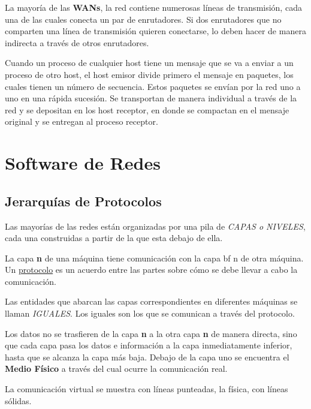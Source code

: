 \documentclass[12pt]{report}
\begin{document}
 La mayor\'ia de las {\bf WANs}, la red contiene numerosas l\'ineas de transmisi\'on, cada una de las cuales conecta un par de enrutadores. Si dos enrutadores que no comparten una l\'inea de transmisi\'on quieren conectarse, lo deben hacer de manera indirecta a trav\'es de otros enrutadores.
  
Cuando un proceso de cualquier host tiene un mensaje que se va a enviar a un proceso de otro host, el host emisor divide primero el mensaje en paquetes, los cuales tienen un n\'umero de secuencia. Estos paquetes se env\'ian por la red uno a uno en una r\'apida sucesi\'on. Se transportan de manera individual a trav\'es de la red y se depositan en los host receptor, en donde se compactan en el mensaje original y se entregan al proceso receptor. 

\section*{Software de Redes}
\subsection*{Jerarqu\'ias de Protocolos}

Las mayor\'ias de las redes est\'an organizadas por una pila de \textit {CAPAS o NIVELES}, cada una construidas a partir de la que esta debajo de ella. 

La capa {\bf n} de una m\'aquina tiene comunicaci\'on con la capa {bf n} de otra m\'aquina. Un \underline {protocolo} es un acuerdo entre las partes sobre c\'omo se debe llevar a cabo la comunicaci\'on.
 
Las entidades que abarcan las capas correspondientes en diferentes m\'aquinas se llaman \textit {IGUALES}. Los iguales son los que se comunican a trav\'es del protocolo.


Los datos no se trasfieren de la capa {\bf n}  a la otra capa {\bf n} de manera directa, sino que cada capa pasa los datos e informaci\'on a la capa inmediatamente inferior, hasta que se alcanza la capa m\'as baja. Debajo de la capa uno se encuentra el {\bf Medio F\'isico} a trav\'es del cual ocurre la comunicaci\'on real.

La comunicaci\'on virtual se muestra con l\'ineas punteadas, la f\'isica, con l\'ineas s\'olidas.
\end{document}
